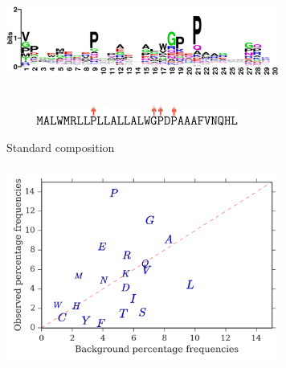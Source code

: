 \documentclass{beamer}
\begin{document}
\begin{frame}
\begin{adjustwidth}{-1.5em}{-2.5em}
\includegraphics[width=340px,height=150px]{../img/logo.png}\\ 
\hspace{18px}\includegraphics[width=325px,height=25px]{../img/sequence2.png}
\end{adjustwidth}
\end{frame}













\begin{frame}
\centering
Standard composition
\begin{adjustwidth}{-1.5em}{-2.5em}
\includegraphics[width=340px,height=250px]{../img/frequenciesComparison.png}\\ 
\end{adjustwidth}
\end{frame}
\end{document}
